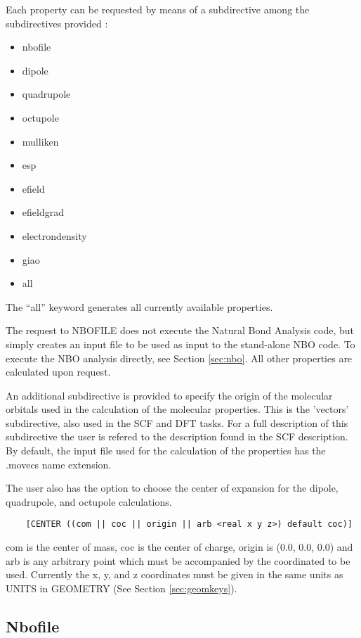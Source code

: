 Each property can be requested by means of a subdirective among the
subdirectives provided :

\begin{itemize}
\item nbofile
\item dipole
\item quadrupole
\item octupole
\item mulliken
\item esp
\item efield
\item efieldgrad
\item electrondensity
\item giao 
\item all 
\end{itemize}

The ``all'' keyword generates all currently available properties. 

The request to NBOFILE does not execute the Natural Bond Analysis
code, but simply creates an input file to be used as input to the
stand-alone NBO code. To execute the NBO analysis directly, see Section
\ref{sec:nbo}. All other properties are calculated upon
request.

An additional subdirective is provided to specify the origin of the
molecular orbitals used in the calculation of the molecular
properties. This is the 'vectors' subdirective, also used in the
SCF and DFT tasks. For a full description of this subdirective
the user is refered to the description found in the SCF description.
By default, the input file used for the calculation of the properties
has the .movecs name extension. 

The user also has the option to choose the center of expansion for
the dipole, quadrupole, and octupole calculations.

\begin{verbatim}
    [CENTER ((com || coc || origin || arb <real x y z>) default coc)]
\end{verbatim}

com is the center of mass, coc is the center of charge, origin is 
(0.0, 0.0, 0.0) and arb is any arbitrary point which must be accompanied
by the coordinated to be used.  Currently the x, y, and z coordinates
must be given in the same units as UNITS in GEOMETRY (See Section
\ref{sec:geomkeys}).

\subsection{Nbofile}
\label{sec:Nbofile}

